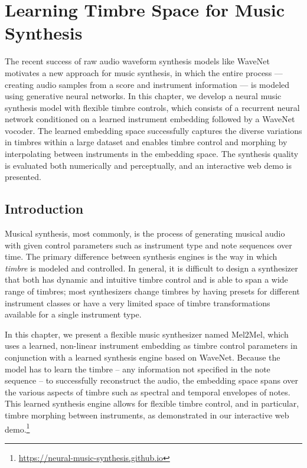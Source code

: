 
\graphicspath{{5-synthesis/figures/}}

\chapter{Learning Timbre Space for Music Synthesis}
\label{ch:synthesis}

The recent success of raw audio waveform synthesis models like WaveNet motivates a new approach for music synthesis, in which the entire process --- creating audio samples from a score and instrument information --- is modeled using generative neural networks.
In this chapter, we develop a neural music synthesis model with flexible timbre controls, which consists of a recurrent neural network conditioned on a learned instrument embedding followed by a WaveNet vocoder.
The learned embedding space successfully captures the diverse variations in timbres within a large dataset and enables timbre control and morphing by interpolating between instruments in the embedding space.
The synthesis quality is evaluated both numerically and perceptually, and an interactive web demo is presented.


\section{Introduction}

Musical synthesis, most commonly, is the process of generating musical audio with given control parameters such as instrument type and note sequences over time.
The primary difference between synthesis engines is the way in which \emph{timbre} is modeled and controlled.
In general, it is difficult to design a synthesizer that both has dynamic and intuitive timbre control and is able to span a wide range of timbres; most synthesizers change timbres by having presets for different instrument classes or have a very limited space of timbre transformations available for a single instrument type.

In this chapter, we present a flexible music synthesizer named Mel2Mel, which uses a learned, non-linear instrument embedding as timbre control parameters in conjunction with a learned synthesis engine based on WaveNet.
Because the model has to learn the timbre -- any information not specified in the note sequence -- to successfully reconstruct the audio, the embedding space spans over the various aspects of timbre such as spectral and temporal envelopes of notes.
This learned synthesis engine allows for flexible timbre control, and in particular, timbre morphing between instruments, as demonstrated in our interactive web demo.\footnote{\url{https://neural-music-synthesis.github.io}}

